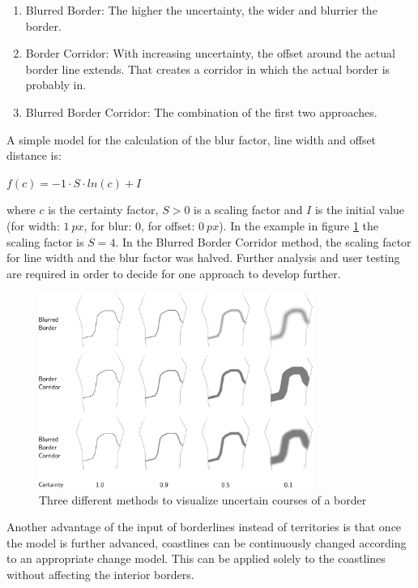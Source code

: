 \begin{enumerate}
  \item Blurred Border: The higher the uncertainty, the wider and blurrier the border.
  \item Border Corridor: With increasing uncertainty, the offset around the actual border line extends. That creates a corridor in which the actual border is probably in.
  \item Blurred Border Corridor: The combination of the first two approaches.
\end{enumerate}

A simple model for the calculation of the blur factor, line width and offset distance is:
\begin{center}
\begin{math}
    f(c) = -1 \cdot S \cdot ln(c) + I
\end{math}
\end{center}
where $c$ is the certainty factor, $S>0$ is a scaling factor and $I$ is the initial value (for width: $1~px$, for blur: $0$, for offset: $0~px$). In the example in figure \ref{fig:uncertainty_border} the scaling factor is $S=4$. In the Blurred Border Corridor method, the scaling factor for line width and the blur factor was halved. Further analysis and user testing are required in order to decide for one approach to develop further.

\begin{figure}[ht]
  \vspace{1em}
  \centering
  \includegraphics[width = 0.8\textwidth]{graphics/extensions/border}
  \caption{Three different methods to visualize uncertain courses of a border}
  \label{fig:uncertainty_border}
\end{figure}

Another advantage of the input of borderlines instead of territories is that once the model is further advanced, coastlines can be continuously changed according to an appropriate change model. This can be applied solely to the coastlines without affecting the interior borders.

